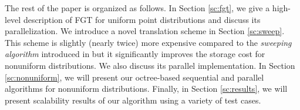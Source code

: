 The rest of the paper is organized as follows. In Section \ref{sc:fgt}, we give a high-level description of FGT for uniform point distributions and discuss its parallelization. We introduce a novel translation scheme in Section \ref{sc:sweep}. This scheme is slightly (nearly twice) more expensive compared to the {\em sweeping algorithm} introduced in \cite{greengard98} but it significantly improves the storage cost for nonuniform distributions. We also discuss its parallel implementation. In Section \ref{sc:nonuniform}, we will present our octree-based sequential and parallel algorithms for nonuniform distributions. Finally, in Section \ref{sc:results}, we will present scalability results of our algorithm using a variety of test cases. 

